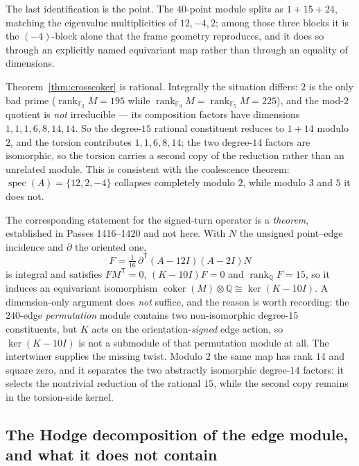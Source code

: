 The last identification is the point. The $40$-point module splits as
$1+15+24$, matching the eigenvalue multiplicities of $12,-4,2$; among those three
blocks it is the $(-4)$-block alone that the frame geometry reproduces, and it
does so through an explicitly named equivariant map rather than through an
equality of dimensions.

\begin{remark}\label{rem:crossscope}
Theorem~\ref{thm:crosscoker} is rational. Integrally the situation differs: $2$
is the only bad prime ($\operatorname{rank}_{\mathbb{F}_2}M=195$ while
$\operatorname{rank}_{\mathbb{F}_3}M=\operatorname{rank}_{\mathbb{F}_5}M=225$),
and the mod-$2$ quotient is \emph{not} irreducible --- its composition factors
have dimensions $1,1,1,6,8,14,14$. So the degree-$15$ rational constituent
reduces to $1+14$ modulo $2$, and the torsion contributes $1,1,6,8,14$; the two
degree-$14$ factors are isomorphic, so the torsion carries a second copy of the
reduction rather than an unrelated module. This is
consistent with the coalescence theorem: $\operatorname{spec}(A)=\{12,2,-4\}$
collapses completely modulo $2$, while modulo $3$ and $5$ it does not.

The corresponding statement for the signed-turn operator is a \emph{theorem},
established in Passes 1416--1420 and not here. With $N$ the unsigned point--edge
incidence and $\partial$ the oriented one,
\[
  F=\tfrac{1}{16}\,\partial^{\mathsf T}(A-12I)(A-2I)N
\]
is integral and satisfies $FM^{\mathsf T}=0$, $(K-10I)F=0$ and
$\operatorname{rank}_{\mathbb{Q}}F=15$, so it induces an equivariant isomorphism
$\operatorname{coker}(M)\otimes\mathbb{Q}\cong\ker(K-10I)$. A dimension-only
argument does \emph{not} suffice, and the reason is worth recording: the
$240$-edge \emph{permutation} module contains two non-isomorphic degree-$15$
constituents, but $K$ acts on the orientation-\emph{signed} edge action, so
$\ker(K-10I)$ is not a submodule of that permutation module at all. The
intertwiner supplies the missing twist. Modulo $2$ the same map has rank $14$ and
square zero, and it separates the two abstractly isomorphic degree-$14$ factors:
it selects the nontrivial reduction of the rational $15$, while the second copy
remains in the torsion-side kernel.
\end{remark}

\subsection*{The Hodge decomposition of the edge module, and what it does not
contain}
\label{sec:hodgeblocks}

